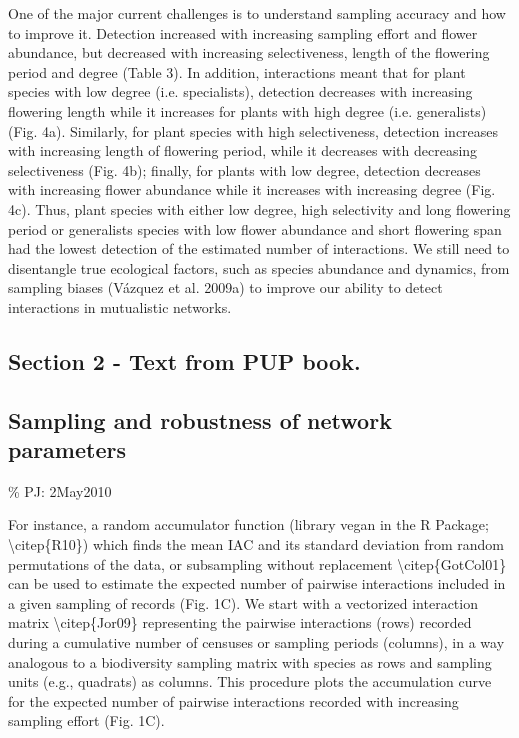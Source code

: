\documentclass[a4paper,12pt]{article}
\begin{document}
\begin{spacing}{1.0}
One of the major current challenges is to understand sampling accuracy and how to improve it.
Detection increased with increasing sampling effort and flower abundance, but decreased with increasing selectiveness, length of the flowering period and degree (Table 3). In addition, interactions meant that for plant species with low degree (i.e. specialists), detection decreases with increasing flowering length while it increases for plants with high degree (i.e. generalists) (Fig. 4a). Similarly, for plant species with high selectiveness, detection increases with increasing length of flowering period, while it decreases with decreasing selectiveness (Fig. 4b); finally, for plants with low degree, detection decreases with increasing flower abundance while it increases with increasing degree (Fig. 4c). Thus, plant species with either low degree, high selectivity and long flowering period or generalists species with low flower abundance and short flowering span had the lowest detection of the estimated number of interactions.
We still need to disentangle true ecological factors, such as species abundance and dynamics, from sampling biases (Vázquez et al. 2009a) to improve our ability to detect interactions in mutualistic networks.

\subsection{Section 2 - Text from PUP book.}
\label{section2-textfrompupbook.}

\subsection{Sampling and robustness of network parameters}
\label{samplingandrobustnessofnetworkparameters}

\% PJ: 2May2010

For instance, a random accumulator function (library vegan in the R Package; \textbackslash{}citep\{R10\}) which finds the mean IAC and its standard deviation from random permutations of the data, or subsampling without replacement \textbackslash{}citep\{GotCol01\} can be used to estimate the expected number of pairwise interactions included in a given sampling of records (Fig. 1C). We start with a vectorized interaction matrix \textbackslash{}citep\{Jor09\} representing the pairwise interactions (rows) recorded during a cumulative number of censuses or sampling periods (columns), in a way analogous to a biodiversity sampling matrix with species as rows and sampling units (e.g., quadrats) as columns. This procedure plots the accumulation curve for the expected number of pairwise interactions recorded with increasing sampling effort (Fig. 1C).


\end{spacing}
\end{document}

